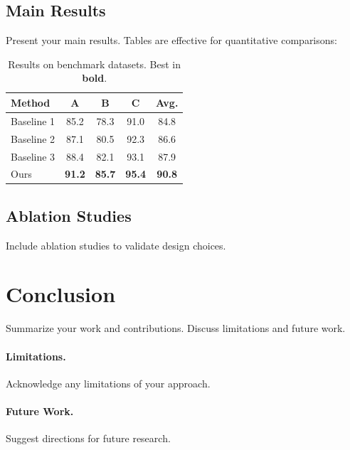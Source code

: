 \documentclass[10pt,a4paper,twocolumn]{article}
\begin{document}
\subsection{Main Results}
\label{sec:results}

Present your main results. Tables are effective for quantitative comparisons:

\begin{table}[t]
    \centering
    \caption{Results on benchmark datasets. Best in \textbf{bold}.}
    \label{tab:results}
    \small
    \begin{tabular}{lcccc}
        \toprule
        \textbf{Method} & \textbf{A} & \textbf{B} & \textbf{C} & \textbf{Avg.} \\
        \midrule
        Baseline 1 & 85.2 & 78.3 & 91.0 & 84.8 \\
        Baseline 2 & 87.1 & 80.5 & 92.3 & 86.6 \\
        Baseline 3 & 88.4 & 82.1 & 93.1 & 87.9 \\
        \midrule
        Ours & \textbf{91.2} & \textbf{85.7} & \textbf{95.4} & \textbf{90.8} \\
        \bottomrule
    \end{tabular}
\end{table}

\subsection{Ablation Studies}
\label{sec:ablations}

Include ablation studies to validate design choices.


\section{Conclusion}
\label{sec:conclusion}

Summarize your work and contributions. Discuss limitations and future work.

\paragraph{Limitations.} Acknowledge any limitations of your approach.

\paragraph{Future Work.} Suggest directions for future research.
\end{document}
